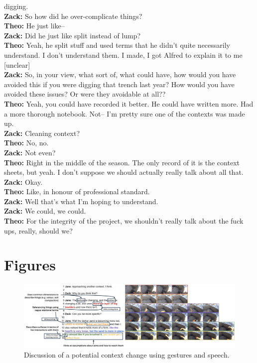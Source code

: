 \documentclass{article}
\begin{document}
digging.\\
\textbf{Zack:} So how did he over-complicate things?\\
\textbf{Theo:} He just like--\\
\textbf{Zack:} Did he just like split instead of lump?\\
\textbf{Theo:} Yeah, he split stuff and used terms that he didn't quite
necessarily understand. I don't understand them. I made, I got Alfred to
explain it to me {[}unclear{]}\\
\textbf{Zack:} So, in your view, what sort of, what could have, how
would you have avoided this if you were digging that trench last year?
How would you have avoided these issues? Or were they avoidable at
all??\\
\textbf{Theo:} Yeah, you could have recorded it better. He could have
written more. Had a more thorough notebook. Not-- I'm pretty sure one of
the contexts was made up.\\
\textbf{Zack:} Cleaning context?\\
\textbf{Theo:} No, no.\\
\textbf{Zack:} Not even?\\
\textbf{Theo:} Right in the middle of the season. The only record of it
is the context sheets, but yeah. I don't suppose we should actually
really talk about all that.\\
\textbf{Zack:} Okay.\\
\textbf{Theo:} Like, in honour of professional standard.\\
\textbf{Zack:} Well that's what I'm hoping to understand.\\
\textbf{Zack:} We could, we could.\\
\textbf{Theo:} For the integrity of the project, we shouldn't really
talk about the fuck ups, really, should we?\newline

\newpage
\section{Figures}
\begin{figure}[hbt!]
  \centering
  \includegraphics[width=6in]{../../figures/context-change-annotated.png}
  \caption{Discussion of a potential context change using gestures and
  speech.}\label{fig-context-change}
\end{figure}
\end{document}
